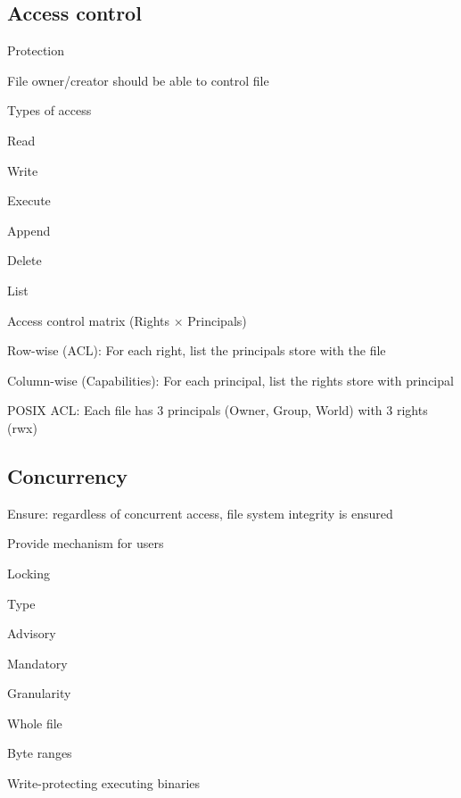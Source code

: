 \subsection{Access control}
\enumstart
	\item Protection
	\enumstart
		\item File owner/creator should be able to control file
		\item Types of access
		\enumstart
			\item Read
			\item Write
			\item Execute
			\item Append
			\item Delete
			\item List
		\enumend
		\item Access control matrix (Rights $\times$ Principals)
		\item Row-wise (ACL): For each right, list the principals \arrow store with the file
		\item Column-wise (Capabilities): For each principal, list the rights \arrow store with principal
		\item POSIX ACL: Each file has 3 principals (Owner, Group, World) with 3 rights (rwx)
	\enumend
\enumend

\subsection{Concurrency}
\enumstart
	\item Ensure: regardless of concurrent access, file system integrity is ensured
	\item Provide mechanism for users
	\item Locking
	\enumstart
		\item Type
		\enumstart
			\item Advisory
			\item Mandatory
		\enumend
		\item Granularity
		\enumstart
			\item Whole file
			\item Byte ranges
			\item Write-protecting executing binaries
		\enumend
	\enumend
\enumend